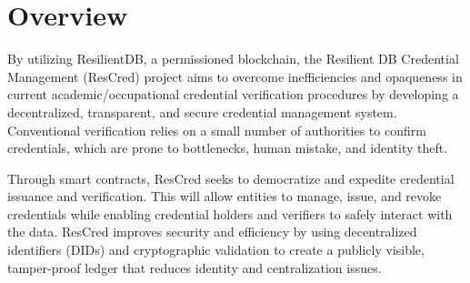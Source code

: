 \section{Overview}
By utilizing ResilientDB, a permissioned blockchain, the Resilient DB Credential Management (ResCred) project aims to overcome inefficiencies and opaqueness in current academic/occupational credential verification procedures by developing a decentralized, transparent, and secure credential management system. Conventional verification relies on a small number of authorities to confirm credentials, which are prone to bottlenecks, human mistake, and identity theft.

Through smart contracts, ResCred seeks to democratize and expedite credential issuance and verification. This will allow entities to manage, issue, and revoke credentials while enabling credential holders and verifiers to safely interact with the data. ResCred improves security and efficiency by using decentralized identifiers (DIDs) and cryptographic validation to create a publicly visible, tamper-proof ledger that reduces identity and centralization issues.

